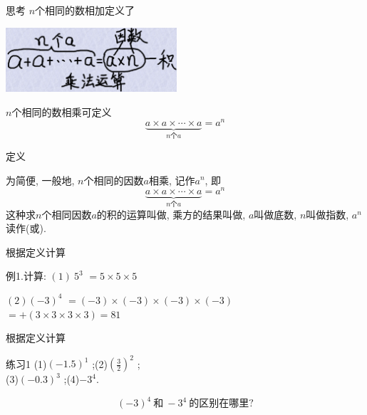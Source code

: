 \documentclass{beamer}
\begin{document}
\begin{frame}
  \begin{block}{思考}
    $n$个相同的数相加定义了\par
    \includegraphics[width=2.5in]{times04.png}\par\pause
    $n$个相同的数相乘可定义 \\\vspace*{-2em}
    $$\underbrace{a\times a\times\cdots\times a}_{n\text{个}a}=a^n$$  
  \end{block}
\end{frame}


\begin{frame}{定义}
  \begin{block}{}
    为简便, 一般地, $n$个相同的因数$a$相乘, 记作$a^n$, 即
      $$\underbrace{a\times a\times\cdots\times a}_{n\text{个}a}=a^n$$  
    这种求$n$个相同因数$a$的积的运算叫做, 乘方的结果叫做, $a$叫做底数, $n$叫做指数, 
$a^n$读作(或).
  \end{block}
\end{frame}


\begin{frame}{根据定义计算}\LARGE
  \begin{exampleblock}{例1.计算:}
    $(1)\ 5^3$ \pause $=5\times5\times5$ \pause    

     $(2) (-3)^4$ \pause $=(-3)\times(-3)\times(-3)\times(-3)$ \pause\\
     \hspace*{4.3em}$=+(3\times3\times3\times3)=81$\\
  \end{exampleblock}
\end{frame}

\begin{frame}{根据定义计算}
  \begin{block}{练习1}
    (1)$(-1.5)^1$ ;\quad (2)${(\frac32)}^2$ ;\\ \pause 
    (3)$(-0.3)^3$ ;\quad (4)$-3^4$.
  \end{block}
\end{frame}

\begin{frame}\Huge
  $$(-3)^4~\text{和}~-3^4~\text{的区别在哪里?}$$
\end{frame}
\end{document}
